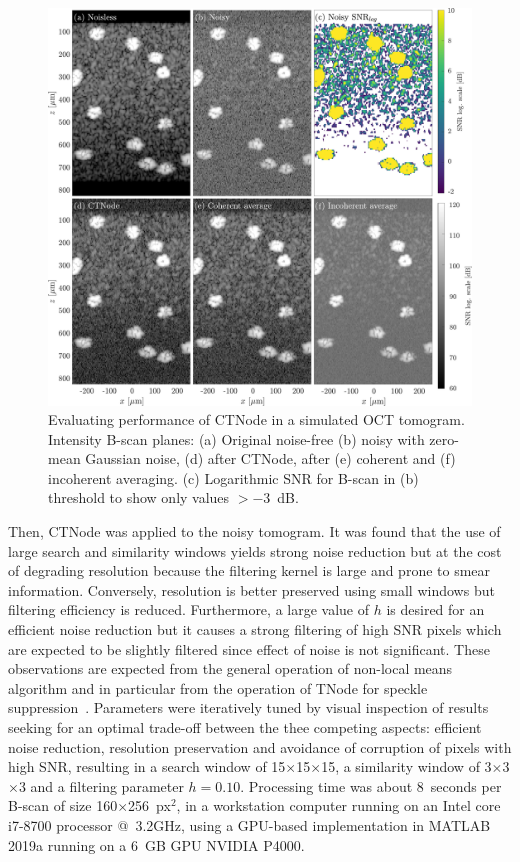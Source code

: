 \begin{figure}[htb!]
	\centering
	\includegraphics[width=\textwidth]{Figures/SHARP/CTNode_Sim_int.pdf}
	\caption[Evaluating performance of CTNode in a simulated OCT tomogram.]{Evaluating performance of CTNode in a simulated OCT tomogram. Intensity B-scan planes: (a) Original noise-free (b) noisy with zero-mean Gaussian noise, (d) after CTNode, after (e) coherent and (f) incoherent averaging. (c) Logarithmic SNR for B-scan in (b) threshold to show only values $>-3$~dB.}
	\label{fig:CTNode_Sim_int}
\end{figure}

Then, CTNode was applied to the noisy tomogram. It was found that the use of large search and similarity windows yields strong noise reduction but at the cost of degrading resolution because the filtering kernel is large and prone to smear information. Conversely, resolution is better preserved using small windows but filtering efficiency is reduced. Furthermore, a large value of $h$ is desired for an efficient noise reduction but it causes a strong filtering of high SNR pixels which are expected to be slightly filtered since effect of noise is not significant. These observations are expected from the general operation of non-local means algorithm and in particular from the operation of TNode for speckle suppression~\cite{Cuartas-Velez2018_Volumetric}. Parameters were iteratively tuned by visual inspection of results seeking for an optimal trade-off between the thee competing aspects: efficient noise reduction, resolution preservation and avoidance of corruption of pixels with high SNR, resulting in a search window of 15$\times$15$\times$15, a similarity window of 3$\times$3$\times$3 and a filtering parameter $h=0.10$. Processing time was about 8~seconds per B-scan of size 160$\times$256~px$^2$, in a workstation computer running on an Intel core i7-8700 processor @~3.2GHz, using a GPU-based implementation in MATLAB 2019a running on a 6~GB GPU NVIDIA P4000.

